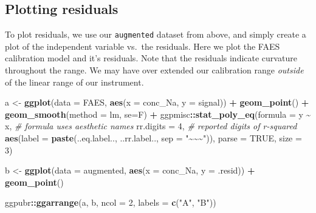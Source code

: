\documentclass[
]{book}
\newenvironment{Shaded}{\begin{snugshade}}{\end{snugshade}}
\newcommand{\AttributeTok}[1]{\textcolor[rgb]{0.13,0.29,0.53}{#1}}
\newcommand{\CommentTok}[1]{\textcolor[rgb]{0.56,0.35,0.01}{\textit{#1}}}
\newcommand{\ConstantTok}[1]{\textcolor[rgb]{0.56,0.35,0.01}{#1}}
\newcommand{\DecValTok}[1]{\textcolor[rgb]{0.00,0.00,0.81}{#1}}
\newcommand{\FunctionTok}[1]{\textcolor[rgb]{0.13,0.29,0.53}{\textbf{#1}}}
\newcommand{\NormalTok}[1]{#1}
\newcommand{\OtherTok}[1]{\textcolor[rgb]{0.56,0.35,0.01}{#1}}
\newcommand{\SpecialCharTok}[1]{\textcolor[rgb]{0.81,0.36,0.00}{\textbf{#1}}}
\newcommand{\StringTok}[1]{\textcolor[rgb]{0.31,0.60,0.02}{#1}}
\begin{document}
\hypertarget{plotting-residuals}{%
\subsection{Plotting residuals}\label{plotting-residuals}}

To plot residuals, we use our \texttt{augmented} dataset from above, and simply create a plot of the independent variable vs.~the residuals. Here we plot the FAES calibration model and it's residuals. Note that the residuals indicate curvature throughout the range. We may have over extended our calibration range \emph{outside} of the linear range of our instrument.

\begin{Shaded}
\begin{Highlighting}[]
\NormalTok{a }\OtherTok{\textless{}{-}} \FunctionTok{ggplot}\NormalTok{(}\AttributeTok{data =}\NormalTok{ FAES,}
       \FunctionTok{aes}\NormalTok{(}\AttributeTok{x =}\NormalTok{ conc\_Na, }
           \AttributeTok{y =}\NormalTok{ signal)) }\SpecialCharTok{+}
  \FunctionTok{geom\_point}\NormalTok{() }\SpecialCharTok{+}
  \FunctionTok{geom\_smooth}\NormalTok{(}\AttributeTok{method =} \StringTok{\textquotesingle{}lm\textquotesingle{}}\NormalTok{, }\AttributeTok{se=}\NormalTok{F) }\SpecialCharTok{+}
\NormalTok{  ggpmisc}\SpecialCharTok{::}\FunctionTok{stat\_poly\_eq}\NormalTok{(}\AttributeTok{formula =}\NormalTok{ y }\SpecialCharTok{\textasciitilde{}}\NormalTok{ x, }\CommentTok{\# formula uses aesthetic names}
                        \AttributeTok{rr.digits =} \DecValTok{4}\NormalTok{, }\CommentTok{\# reported digits of r{-}squared}
                        \FunctionTok{aes}\NormalTok{(}\AttributeTok{label =} \FunctionTok{paste}\NormalTok{(..eq.label.., ..rr.label.., }\AttributeTok{sep =} \StringTok{"\textasciitilde{}\textasciitilde{}\textasciitilde{}"}\NormalTok{)), }
                        \AttributeTok{parse =} \ConstantTok{TRUE}\NormalTok{, }\AttributeTok{size =} \DecValTok{3}\NormalTok{) }

\NormalTok{b }\OtherTok{\textless{}{-}} \FunctionTok{ggplot}\NormalTok{(}\AttributeTok{data =}\NormalTok{ augmented, }
       \FunctionTok{aes}\NormalTok{(}\AttributeTok{x =}\NormalTok{ conc\_Na, }\AttributeTok{y =}\NormalTok{ .resid)) }\SpecialCharTok{+}
  \FunctionTok{geom\_point}\NormalTok{()}

\NormalTok{ggpubr}\SpecialCharTok{::}\FunctionTok{ggarrange}\NormalTok{(a, b, }\AttributeTok{ncol =} \DecValTok{2}\NormalTok{, }\AttributeTok{labels =} \FunctionTok{c}\NormalTok{(}\StringTok{"A"}\NormalTok{, }\StringTok{"B"}\NormalTok{))}
\end{Highlighting}
\end{Shaded}
\end{document}
